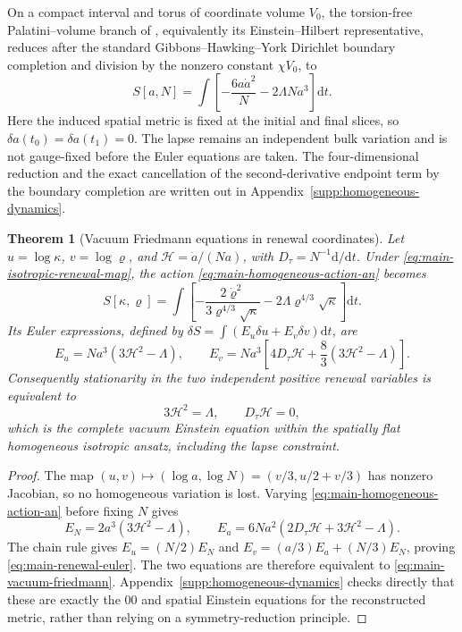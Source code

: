 \documentclass[11pt]{article}
\newtheorem{theorem}{Theorem}[section]
\numberwithin{equation}{section}
\theoremstyle{definition}
\theoremstyle{remark}
\newcommand{\dd}{\mathrm d}
\begin{document}
On a compact interval and torus of coordinate volume $V_0$, the torsion-free
Palatini--volume branch of , equivalently its
Einstein--Hilbert representative, reduces after the standard
Gibbons--Hawking--York Dirichlet boundary completion
\cite{York1972,GibbonsHawking1977} and division by the nonzero constant
$\chi V_0$, to
\begin{equation}
 S[a,N]=\int\left[-\frac{6a\dot a^2}{N}-2\Lambda Na^3\right]\dd t.
 \label{eq:main-homogeneous-action-an}
\end{equation}
Here the induced spatial metric is fixed at the initial and final slices, so
$\delta a(t_0)=\delta a(t_1)=0$.  The lapse remains an independent bulk
variation and is not gauge-fixed before the Euler equations are taken.  The
four-dimensional reduction and the exact cancellation of the second-derivative
endpoint term by the boundary completion are written out in
Appendix~\ref{supp:homogeneous-dynamics}.

\begin{theorem}[Vacuum Friedmann equations in renewal coordinates]
\label{thm:main-homogeneous-friedmann}
Let $u=\log\kappa$, $v=\log\varrho$, and
$\mathcal H=\dot a/(Na)$, with $D_\tau=N^{-1}\dd/\dd t$.  Under
\eqref{eq:main-isotropic-renewal-map}, the action
\eqref{eq:main-homogeneous-action-an} becomes
\begin{equation}
 S[\kappa,\varrho]
 =\int\left[-\frac{2\dot\varrho^2}
 {3\varrho^{4/3}\sqrt\kappa}
 -2\Lambda\varrho^{4/3}\sqrt\kappa\right]\dd t.
 \label{eq:main-renewal-rate-action}
\end{equation}
Its Euler expressions, defined by
$\delta S=\int(E_u\delta u+E_v\delta v)\dd t$, are
\begin{equation}
 E_u=Na^3(3\mathcal H^2-\Lambda),\qquad
 E_v=Na^3\left[4D_\tau\mathcal H+
 \frac83(3\mathcal H^2-\Lambda)\right].
 \label{eq:main-renewal-euler}
\end{equation}
Consequently stationarity in the two independent positive renewal variables is
equivalent to
\begin{equation}
 3\mathcal H^2=\Lambda,\qquad D_\tau\mathcal H=0,
 \label{eq:main-vacuum-friedmann}
\end{equation}
which is the complete vacuum Einstein equation within the spatially flat
homogeneous isotropic ansatz, including the lapse constraint.
\end{theorem}

\begin{proof}
The map $(u,v)\mapsto(\log a,\log N)=(v/3,u/2+v/3)$ has nonzero
Jacobian, so no homogeneous variation is lost.  Varying
\eqref{eq:main-homogeneous-action-an} before fixing $N$ gives
\[
 E_N=2a^3(3\mathcal H^2-\Lambda),\qquad
 E_a=6Na^2(2D_\tau\mathcal H+3\mathcal H^2-\Lambda).
\]
The chain rule gives $E_u=(N/2)E_N$ and
$E_v=(a/3)E_a+(N/3)E_N$, proving
\eqref{eq:main-renewal-euler}.  The two equations are therefore equivalent to
\eqref{eq:main-vacuum-friedmann}.  Appendix~\ref{supp:homogeneous-dynamics}
checks directly that these are exactly the $00$ and spatial Einstein equations
for the reconstructed metric, rather than relying on a symmetry-reduction
principle.
\end{proof}
\end{document}
